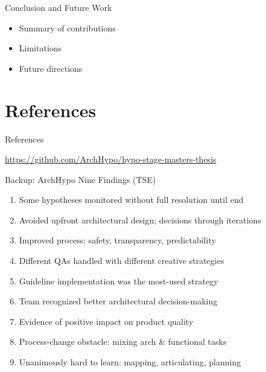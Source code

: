 \documentclass[
  xcolor={hyperref,svgnames,x11names,table},
  hyperref={pdfencoding=unicode,plainpages=false,pdfpagelabels=true,breaklinks=true},
  brazilian,english,12pt,aspectratio=149,
]{beamer}
\begin{document}
\begin{frame}{Conclusion and Future Work}
  \begin{itemize}
    \item Summary of contributions
    \item Limitations
    \item Future directions
  \end{itemize}
\end{frame}


\section{References}

\begin{frame}[allowframebreaks]{References}
  \nocite{silva2024tse, silva2024ieeesw, souza2019, correa2025,
          bass2021, skelton2019, footeYoder1999, richardsFord2020}
  \printbibliography
\end{frame}

\begin{frame}[t]{\insertshorttitle}
  \overview

  \vspace{1\baselineskip}
  \bgroup
  \centering
    \url{https://github.com/ArchHypo/hypo-stage-masters-thesis}\par
  \egroup
\end{frame}

\showqrcode

\appendix

\begin{frame}{Backup: ArchHypo Nine Findings (TSE)}
  \footnotesize
  \begin{enumerate}
    \item Some hypotheses monitored without full resolution until end
    \item Avoided upfront architectural design; decisions through iterations
    \item Improved process: safety, transparency, predictability
    \item Different QAs handled with different creative strategies
    \item Guideline implementation was the most-used strategy
    \item Team recognized better architectural decision-making
    \item Evidence of positive impact on product quality
    \item \alert{Process-change obstacle}: mixing arch \& functional tasks
    \item \alert{Unanimously hard to learn}: mapping, articulating, planning
  \end{enumerate}
\end{frame}
\end{document}
